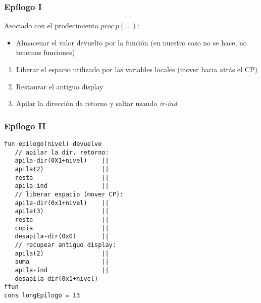 \documentclass[hyperref={pdfpagelabels=false},tree-dvips,compress]{beamer}
\begin{document}
\begin{frame}[fragile]
\frametitle{Epílogo I}

Asociado con el prodecimiento $proc \ p(...)$:
\begin{itemize}[<+->]
	\item Almacenar el valor devuelto por la función (en nuestro caso no se hace, no tenemos funciones)
\end{itemize}
\begin{enumerate}[<+->]
    \item Liberar el espacio utilizado por las variables locales (mover hacia atrás el CP)
    \item Restaurar el antiguo display
    \item Apilar la dirección de retorno y saltar usando \emph{ir-ind}
\end{enumerate}

\end{frame}
\begin{frame}[fragile]
\frametitle{Epílogo II}
\begin{lstlisting}[style=codigoMP,basicstyle=\scriptsize\ttfamily]
fun epilogo(nivel) devuelve
   // apilar la dir. retorno:
   apila-dir(0X1+nivel)    ||
   apila(2)                ||
   resta                   ||
   apila-ind               ||
   // liberar espacio (mover CP):
   apila-dir(0x1+nivel)    ||
   apila(3)                ||
   resta                   ||
   copia                   ||
   desapila-dir(0x0)       ||
   // recupear antiguo display:
   apila(2)                ||
   suma                    ||
   apila-ind               ||
   desapila-dir(0x1+nivel)
ffun
cons longEpilogo = 13
\end{lstlisting}

\end{frame}
\end{document}
